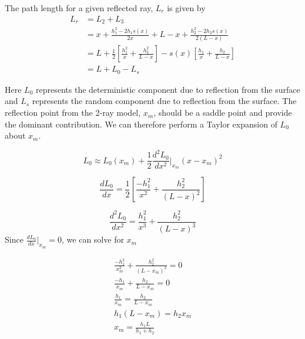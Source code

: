 The path length for a given reflected ray, $L_r$ is given by
\begin{equation}
\begin{aligned}
L_r &= L_2 + L_3 \\
& = x + \frac{h_1^2-2h_1s(x)}{2x} +  L-x + \frac{h_2^2 - 2h_2s(x)}{2\left(L-x\right)} \\
& = L + \frac{1}{2}\left[\frac{h_1^2}{x} + \frac{h_2^2}{L-x} \right] - s(x)\left[ \frac{h_1}{x} + \frac{h_2}{L-x}\right] \\
&= L + L_0 - L_s
\end{aligned}
\label{gf_eq:60}
\end{equation}
\renewcommand{\baselinestretch}{2} \small\normalsize

Here $L_0$ represents the deterministic component due to reflection from the surface and $L_s$ represents the random component due to reflection from the surface. The reflection point from the 2-ray model, $x_m$, should be a saddle point and provide the dominant contribution. We can therefore perform a Taylor expansion of $L_0$ about $x_m$.

\begin{equation}
L_0 \approx L_0(x_m) + \frac{1}{2}\frac{d^2L_0}{dx^2}\bigg|_{x_m}(x-x_m)^2
\label{gf_eq:61}
\end{equation}
\renewcommand{\baselinestretch}{2} \small\normalsize

\begin{equation}
\frac{dL_0}{dx} = \frac{1}{2}\left[\frac{-h_1^2}{x^2} + \frac{h_2^2}{(L-x)^2} \right]
\label{gf_eq:62}
\end{equation}
\renewcommand{\baselinestretch}{2} \small\normalsize

\begin{equation}
\frac{d^2L_0}{dx^2} = \frac{h_1^2}{x^3} + \frac{h_2^2}{(L-x)^3} 
\label{gf_eq:63}
\end{equation}
\renewcommand{\baselinestretch}{2} \small\normalsize
\noindent Since $\frac{dL_0}{dx}\big|_{x_m} = 0$, we can solve for $x_m$

\begin{equation}
\begin{gathered}
\frac{-h_1^2}{x_m^2} + \frac{h_2^2}{(L-x_m)^2} = 0\\
\frac{-h_1}{x_m} + \frac{h_2}{L-x_m} = 0\\
\frac{h_1}{x_m} = \frac{h_2}{L-x_m}\\
h_1(L-x_m) = h_2x_m\\
x_m = \frac{h_1L}{h_1+h_2}
\end{gathered}
\label{gf_eq:64}
\end{equation}
\renewcommand{\baselinestretch}{2} \small\normalsize

